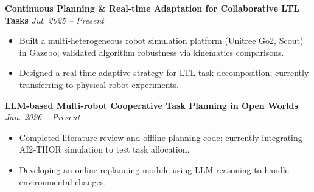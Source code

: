 
\nocite{*}






\noindent\textbf{Continuous Planning \& Real-time Adaptation for Collaborative LTL Tasks} \hfill \textit{Jul. 2025 -- Present}
\begin{itemize}[parsep=0.7ex, leftmargin=1.5em]
  \item Built a multi‑heterogeneous robot simulation platform (Unitree Go2, Scout) in Gazebo; validated algorithm robustness via kinematics comparisons.
  \item Designed a real‑time adaptive strategy for LTL task decomposition; currently transferring to physical robot experiments.
\end{itemize}

\noindent\textbf{LLM‑based Multi‑robot Cooperative Task Planning in Open Worlds} \hfill \textit{Jan. 2026 -- Present}
\begin{itemize}[parsep=0.7ex, leftmargin=1.5em]
  \item Completed literature review and offline planning code; currently integrating AI2‑THOR simulation to test task allocation.
  \item Developing an online replanning module using LLM reasoning to handle environmental changes.
\end{itemize}